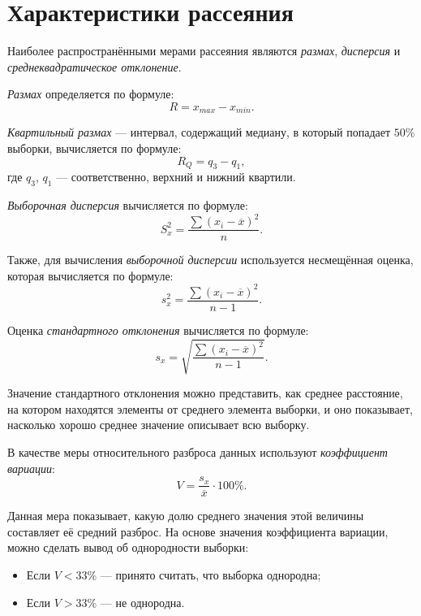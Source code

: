 \section*{Характеристики рассеяния}

Наиболее распространёнными мерами рассеяния являются \textit{размах}, \textit{дисперсия} и \textit{среднеквадратическое отклонение}.

\textit{Размах} определяется по формуле:
\begin{equation*}
	R = x_{max} - x_{min}.
\end{equation*}

\textit{Квартильный размах} --- интервал, содержащий медиану, в который попадает $50\%$ выборки, вычисляется по формуле: 
\begin{equation*}
	R_Q = q_3 - q_1,
\end{equation*}
где $q_3$, $q_1$ --- соответственно, верхний и нижний квартили.

\textit{Выборочная дисперсия} вычисляется по формуле:
\begin{equation*}
	S_x^2 = \frac{\sum{(x_i - \overline{x})^2}}{n}.
\end{equation*}

Также, для вычисления \textit{выборочной дисперсии} используется несмещённая оценка, которая вычисляется по формуле:
\begin{equation*}
	s_x^2 = \frac{\sum{(x_i - \overline{x})^2}}{n - 1}.
\end{equation*}

Оценка \textit{стандартного отклонения} вычисляется по формуле:
\begin{equation*}
	s_x = \sqrt{\frac{\sum{(x_i - \overline{x})^2}}{n - 1}}.
\end{equation*}

Значение стандартного отклонения можно представить, как среднее расстояние, на котором находятся элементы от среднего элемента выборки, и оно показывает, насколько хорошо среднее значение описывает всю выборку.

В качестве меры относительного разброса данных используют \textit{коэффициент вариации}:
\begin{equation*}
	V = \frac{s_x}{\overline{x}} \cdot 100\%.
\end{equation*}

Данная мера показывает, какую долю среднего значения этой величины составляет её средний разброс. На основе значения коэффициента вариации, можно сделать вывод об однородности выборки: 
\begin{itemize}
	\item Если $V < 33\%$ --- принято считать, что выборка однородна;
	\item Если $V > 33\%$ --- не однородна.
\end{itemize}


